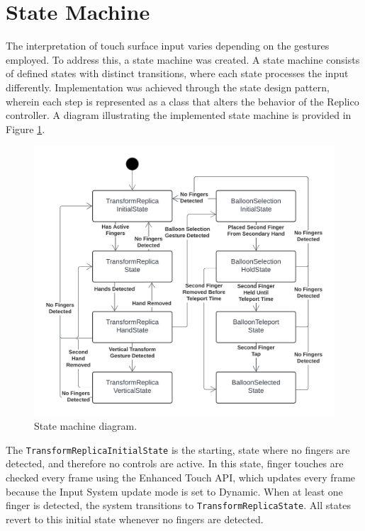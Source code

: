 \section{State Machine}

    The interpretation of touch surface input varies depending on the gestures employed. To address this, a state machine was created. A state machine consists of defined states with distinct transitions, where each state processes the input differently. Implementation was achieved through the state design pattern, wherein each step is represented as a class that alters the behavior of the Replico controller. A diagram illustrating the implemented state machine is provided in Figure \ref{fig:states}.

    \begin{figure}[h]
        \centering
        \includegraphics[width=1\linewidth]{figures/states.png}
        \caption{State machine diagram.}
        \label{fig:states}
    \end{figure}

    The \lstinline{TransformReplicaInitialState} is the starting, state where no fingers are detected, and therefore no controls are active. In this state, finger touches are checked every frame using the Enhanced Touch API, which updates every frame because the Input System update mode is set to Dynamic. When at least one finger is detected, the system transitions to \lstinline{TransformReplicaState}. All states revert to this initial state whenever no fingers are detected.
    
